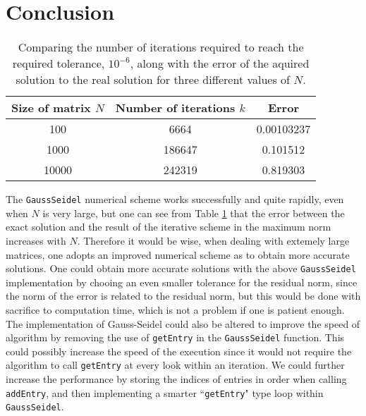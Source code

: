 \documentclass[a4paper,11pt]{article}
\theoremstyle{break}
\theoremstyle{break2}
\theoremstyle{break}
\theoremstyle{break2}
\begin{document}
\section{Conclusion}
\begin{table}
	\begin{center}
		\begin{tabular}{c|c|c}
			Size of matrix $ N $ & Number of iterations $ k $ & Error \\
			\hline
			100 & 6664 & 0.00103237 \\
			1000 & 186647 & 0.101512 \\
			10000 & 242319 & 0.819303
		\end{tabular}
	\end{center}
	\caption{Comparing the number of iterations required to reach the required tolerance, $ 10^{-6} $, along with the error of the aquired solution to the real solution for three different values of $ N $.\label{Talbe:NComparison}}
\end{table}
The \texttt{GaussSeidel} numerical scheme works successfully and quite rapidly, even when $ N $ is very large, but one can see from Table \ref{Talbe:NComparison} that the error between the exact solution and the result of the iterative scheme in the maximum norm increases with $ N $. Therefore it would be wise, when dealing with extemely large matrices, one adopts an improved numerical scheme as to obtain more accurate solutions. One could obtain more accurate solutions with the above \texttt{GaussSeidel} implementation by chooing an even smaller tolerance for the residual norm, since the norm of the error is related to the residual norm, but this would be done with sacrifice to computation time, which is not a problem if one is patient enough. The implementation of Gauss-Seidel could also be altered to improve the speed of algorithm by removing the use of \texttt{getEntry} in the \texttt{GaussSeidel} function. This could possibly increase the speed of the execution since it would not require the algorithm to call \texttt{getEntry} at every look within an iteration. We could further increase the performance by storing the indices of entries in order when calling \texttt{addEntry}, and then implementing a smarter ``\texttt{getEntry}" type loop within \texttt{GaussSeidel}.

\end{document}
